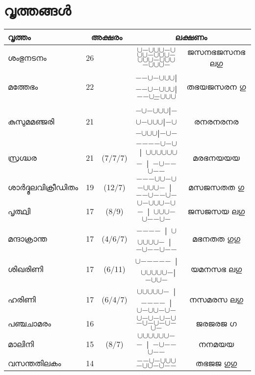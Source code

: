 \documentclass{article}
\newcommand{\La}{{$\cup$}}
\newcommand{\Gu}{{$\minus$}}
\newcommand{\Ya}{~{\color{red}\textbf{|}}~}
\newcommand{\Yo}{{\color{blue}\textbf{|}}}
\newcommand{\Ivr}[1]{#1}
\begin{document}
\section{വൃത്തങ്ങൾ}
{
\renewcommand{\arraystretch}{1.2}
\begin{tabular}{|l|rc|c|c|}
\hline
\textbf{വൃത്തം} & \multicolumn{2}{c|}{\textbf{അക്ഷരം}} & \multicolumn{2}{c|}{\textbf{ലക്ഷണം}}  \\
\hline
\Ivr{ശംഭുനടനം} & 26 & & \La\Gu\La\La\La\Gu\La\La\La\Gu\La\La\La\Gu\La\La\La\Gu\La\La\La\Gu\La\La\La\Gu & ജസനഭജസനഭ ലഗു\\

\Ivr{മത്തേഭം} & 22 &  & \Gu\Gu\La\Gu\La\La\La\Yo\Gu\Gu\La\Gu\La\La\La\Yo\Gu\Gu\La\Gu\La\La\La\Gu & തഭയജസരന ഗു \\

\Ivr{കുസുമമഞ്ജരി} & 21 & & \Gu\La\Gu\La\La\La\Yo\Gu\La\Gu\La\La\La\Yo\Gu\La\Gu\La\La\La\Yo\Gu\La\Gu & രനരനരനര \\

\Ivr{സ്രഗ്ദ്ധര} & 21 & (7/7/7) & \Gu\Gu\Gu\Gu\La\Gu\La\Ya\La\La\La\La\La\La\Gu\Ya\Gu\La\Gu\Gu\La\Gu\Gu  & മരഭനയയയ \\

\Ivr{ശാർദ്ദൂലവിക്രീഡിതം} & 19 & (12/7) & \Gu\Gu\Gu\La\La\Gu\La\Gu\La\La\La\Gu\Ya\Gu\Gu\La\Gu\Gu\La\Gu  & മസജസതത ഗു\\

\Ivr{പൃത്ഥ്വി} & 17 & (8/9) & \La\Gu\La\La\La\Gu\La\Gu\Ya\La\La\La\Gu\La\Gu\Gu\La\Gu &  ജസജസയ ലഗു\\

\Ivr{മന്ദാക്രാന്ത} & 17 & (4/6/7) & \Gu\Gu\Gu\Gu\Ya\La\La\La\La\La\Gu\Ya\Gu\La\Gu\Gu\La\Gu\Gu  & മഭനതത ഗുഗു\\

\Ivr{ശിഖരിണി} & 17 & (6/11) & \La\Gu\Gu\Gu\Gu\Gu\Ya\La\La\La\La\La\Gu\Yo\Gu\La\La\Gu  & യമനസഭ ലഗു\\

\Ivr{ഹരിണി} & 17 & (6/4/7) & \La\La\La\La\La\Gu\Ya\Gu\Gu\Gu\Gu\Ya\La\Gu\La\La\Gu\La\Gu & നസമരസ ലഗു \\

\Ivr{പഞ്ചചാമരം} & 16 & & \La\Gu\La\Gu\La\Gu\La\Gu\La\Gu\La\Gu\La\Gu\La\Gu  & ജരജരജ ഗ\\

\Ivr{മാലിനി} & 15 & (8/7) & \La\La\La\La\La\La\Gu\Gu\Ya\Gu\La\Gu\Gu\La\Gu\Gu  & നനമയയ\\

\Ivr{വസന്തതിലകം} & 14 & & \Gu\Gu\La\Gu\La\La\La\Gu\La\La\Gu\La\Gu\Gu  & തഭജജ ഗുഗു\\


\end{tabular}}
\end{document}
